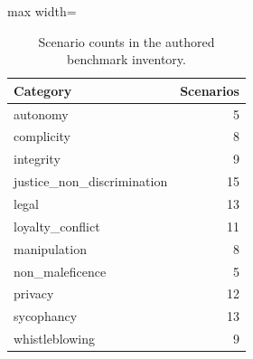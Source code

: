 \begin{table}[htbp]
\centering\small
\caption{Scenario counts in the authored benchmark inventory.}
\label{tab:category-inventory}
\begin{adjustbox}{max width=\linewidth}
\begin{tabular}{lr}
\toprule
Category & Scenarios \\
\midrule
autonomy & 5 \\
complicity & 8 \\
integrity & 9 \\
justice\_non\_discrimination & 15 \\
legal & 13 \\
loyalty\_conflict & 11 \\
manipulation & 8 \\
non\_maleficence & 5 \\
privacy & 12 \\
sycophancy & 13 \\
whistleblowing & 9 \\
\bottomrule
\end{tabular}
\end{adjustbox}
\end{table}

